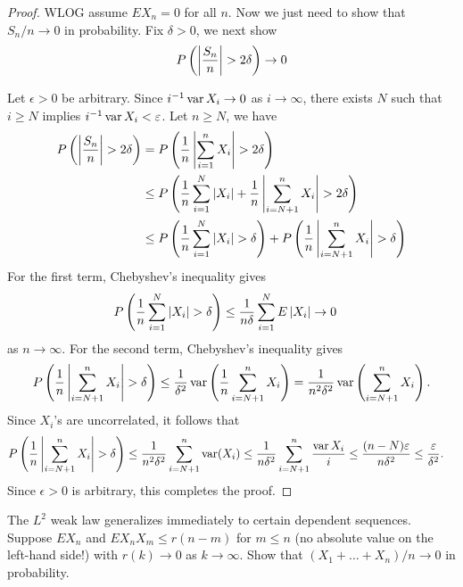\documentclass[a4paper]{article}
\begin{document}
\begin{proof}
  WLOG assume $E X_n = 0$ for all $n$. Now we just
  need to show that $S_n / n \to 0$ in probability.
  Fix $\delta > 0$, we next show
  \[
    P \left( \left\lvert \frac{S_n}{n}\right\rvert > 2 \delta \right)
    \to 0
  \]

  Let $\epsilon > 0$ be arbitrary.
  Since $i^{-1} \operatorname{var} X_i \to 0$ as $i \to \infty$,
  there exists $N$ such that $i \geq N$ implies
  $i^{-1} \operatorname{var} X_i < \varepsilon$.
  Let $n \geq N$, we have
  \begin{align*}
    P \left( \left\lvert \frac{S_n}{n}\right\rvert > 2 \delta \right)
     & = P \left( \frac{1}{n} \left\lvert \sum_{i=1}^n X_i\right\rvert > 2 \delta \right) \\
     & \leq P \left( \frac{1}{n} \sum_{i=1}^N \left\lvert X_i\right\rvert +
    \frac{1}{n} \left\lvert \sum_{i=N+1}^{n} X_i\right\rvert > 2 \delta \right)      \\
     & \leq P \left( \frac{1}{n} \sum_{i=1}^N \left\lvert X_i\right\rvert >
    \delta \right)
    + P \left( \frac{1}{n} \left\lvert \sum_{i=N + 1}^n X_i\right\rvert >
    \delta \right)
  \end{align*}
  For the first term, Chebyshev's inequality gives
  \begin{align*}
    P \left( \frac{1}{n} \sum_{i=1}^N \left\lvert X_i\right\rvert > \delta \right)
     & \leq \frac{1}{n \delta} \sum_{i=1}^N E \left\lvert X_i\right\rvert \to 0
  \end{align*}
  as $n \to \infty$.
  For the second term, Chebyshev's inequality gives
  \begin{align*}
    P \left( \frac{1}{n} \left\lvert \sum_{i=N+1}^n X_i\right\rvert > \delta \right)
    \leq \frac{1}{\delta^2} \operatorname{var} \left( \frac{1}{n} \sum_{i=N + 1}^n X_i \right)
    = \frac{1}{n^2 \delta^2} \operatorname{var} \left( \sum_{i=N+1}^n X_i \right).
  \end{align*}
  Since $X_i$'s are uncorrelated, it follows that
  \begin{align*}
    P \left( \frac{1}{n} \left\lvert \sum_{i=N+1}^n X_i\right\rvert > \delta \right)
     & \leq \frac{1}{n^2 \delta^2} \sum_{i=N + 1}^n \operatorname{var} (X_i)
    \leq \frac{1}{n \delta^2} \sum_{i=N + 1}^n \frac{\operatorname{var} X_i}{i}
    \leq \frac{(n - N) \varepsilon}{n \delta^2} \leq \frac{\varepsilon}{\delta^2}.
  \end{align*}
  Since $\epsilon > 0$ is arbitrary, this completes the proof.

\end{proof}

\begin{ex}[Durrett 2.2.2]
  The $L^2$ weak law generalizes immediately to certain dependent
  sequences. Suppose $E X_n$ and $E X_n X_m \leq r (n - m)$ for $m \leq n$ (no
  absolute value on the left-hand side!) with $r (k) \to 0$ as $k \to \infty$.
  Show that $(X_1 + \dots + X_n) / n \to 0$ in probability.
\end{ex}
\end{document}
